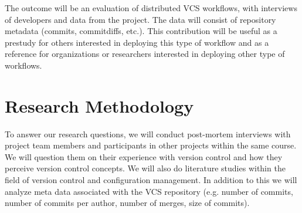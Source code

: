 \documentclass{article}
\begin{document}
The outcome will be an evaluation of distributed VCS workflows, with
interviews of developers and data from the project. The data will
consist of repository metadata (commits, commitdiffs, etc.). This
contribution will be useful as a prestudy for others interested in
deploying this type of workflow and as a reference for organizations or
researchers interested in deploying other type of workflows.

\section{Research Methodology}

To answer our research questions, we will conduct post-mortem interviews
with project team members and participants in other projects within the
same course. We will question them on their experience with version
control and how they perceive version control concepts. We will also do
literature studies within the field of version control and configuration
management. In addition to this we will analyze meta data associated
with the VCS repository (e.g. number of commits, number of commits per
author, number of merges, size of commits).




\end{document}
